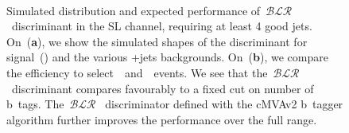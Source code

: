 \begin{figure}
\begin{centering}
\\
\caption[Expected performance of the b-tag likelihood ratio discriminant.]{Simulated distribution and expected performance of~$\mathcal{BLR}$~discriminant in the SL channel, requiring at least 4 good jets. On~(\textbf{a}), we show the simulated shapes of the discriminant for signal~(\ttHbb) and the various \ttbar+jets backgrounds. On~(\textbf{b}), we compare the efficiency to select~\ttHbb~and~\ttlf~events. We see that the~$\mathcal{BLR}$~discriminant compares favourably to a fixed cut on number of b~tags. The~$\mathcal{BLR}$~ discriminator defined with the cMVAv2 b~tagger algorithm further improves the performance over the full range.}
\label{fig:blr_discrimination}
\end{centering}
\end{figure}


